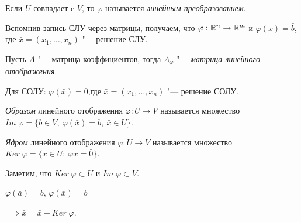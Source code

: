 Если $U$ совпадает c $V$, то $\varphi$ называется \textit{линейным преобразованием}.

Вспомнив запись СЛУ через матрицы, получаем, что 
$\varphi: \mathbb{R}^n \to \mathbb{R}^m$ и $\varphi(\bar{x}) = \bar{b}$, где $\bar{x} = (x_1, \ldots, x_n)$ "--- решение СЛУ.

Пусть  $A$ "--- матрица коэффициентов, тогда $A_\varphi$ "--- \textit{матрица линейного отображения}.

Для СОЛУ: $\varphi(\bar{x}) = \bar{0}$,где $\bar{x} = (x_1, \ldots, x_n)$ "--- решение СОЛУ.
\begin{definition}
    \textit{Образом} линейного отображения $\varphi: U \to V$ называется множество $Im\;\varphi = \{\bar{b} \in V, ~\varphi(\bar{x}) = \bar{b}, ~\bar{x} \in U \}$.
\end{definition}
\begin{definition}
    \label{def:core_lin}
    \textit{Ядром} линейного отображения $\varphi: U \to V$ называется множество $Ker\;\varphi = \{\bar{x} \in U:~\varphi{\bar{x}} = \bar{0} \}$.
\end{definition}
Заметим, что $Ker\;\varphi \subset U$ и $Im\;\varphi \subset V$.

\begin{theorem}
    $\varphi(\bar{a}) = \bar{b}$, $\varphi(\bar{x}) = \bar{b}$

    $\implies \bar{x} = \bar{x} + Ker\;\varphi$.
\end{theorem}


